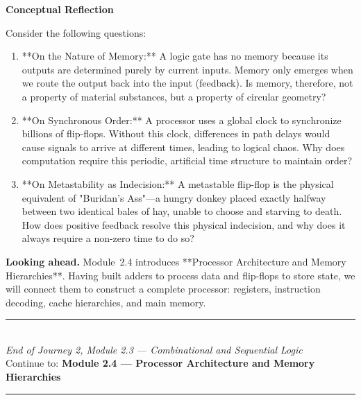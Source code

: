 \documentclass[12pt, a4paper]{book}
\begin{document}
\begin{reflectionbox}
\textbf{Conceptual Reflection}

Consider the following questions:
\begin{enumerate}
  \item **On the Nature of Memory:** A logic gate has no memory because its outputs are determined purely by current inputs. Memory only emerges when we route the output back into the input (feedback). Is memory, therefore, not a property of material substances, but a property of circular geometry?
  \item **On Synchronous Order:** A processor uses a global clock to synchronize billions of flip-flops. Without this clock, differences in path delays would cause signals to arrive at different times, leading to logical chaos. Why does computation require this periodic, artificial time structure to maintain order?
  \item **On Metastability as Indecision:** A metastable flip-flop is the physical equivalent of "Buridan's Ass"—a hungry donkey placed exactly halfway between two identical bales of hay, unable to choose and starving to death. How does positive feedback resolve this physical indecision, and why does it always require a non-zero time to do so?
\end{enumerate}
\end{reflectionbox}

\medskip
\noindent\textbf{Looking ahead.}
Module~2.4 introduces **Processor Architecture and Memory Hierarchies**. Having built adders to process data and flip-flops to store state, we will connect them to construct a complete processor: registers, instruction decoding, cache hierarchies, and main memory.

\vspace{1.4cm}
\begin{center}
{\color{JourneyColor}\rule{0.5\linewidth}{0.8pt}}\\[6pt]
{\small\color{JourneyColor}\textit{End of Journey 2, Module 2.3 --- Combinational and Sequential Logic}}\\[4pt]
{\small\color{JourneyColor}Continue to: \textbf{Module 2.4 --- Processor Architecture and Memory Hierarchies}}\\[6pt]
{\color{JourneyColor}\rule{0.5\linewidth}{0.8pt}}
\end{center}
\end{document}
